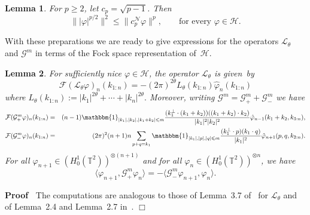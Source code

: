 \documentclass[10pt]{article}
\newcommand{\assign}{:=}
\newenvironment{proof}{\noindent\textbf{Proof\ }}{\hspace*{\fill}$\Box$\medskip}
\newtheorem{lemma}{Lemma}
\begin{document}
\begin{lemma}
  \label{lemma:hyper-n}For $p \geqslant 2$, let $c_p = \sqrt{p - 1}$. Then
  \[ \| | \varphi |^{p / 2} \|^2 \leqslant \| c_p^{\mathcal{N}} \varphi \|^p,
     \qquad \text{for every } \varphi \in \mathcal{H}. \]
\end{lemma}

With these preparations we are ready to give expressions for the operators
$\mathcal{L}_{\theta}$ and $\mathcal{G}^m$ in terms of the Fock space
representation of~$\mathcal{H}$.

\begin{lemma}
  For sufficiently nice $\varphi \in \mathcal{H}$, the operator
  $\mathcal{L}_{\theta}$ is given~by
  \begin{equation}
    \mathcal{F} (\mathcal{L}_{\theta} \varphi)_n (k_{1 : n}) = - (2 \pi)^{2
    \theta} L_{\theta} (k_{1 : n}) \hat{\varphi}_n (k_{1 : n})
    \label{eq:ltheta-fourier}
  \end{equation}
  where $L_{\theta} (k_{1 : n}) \assign | k_1 |^{2 \theta} + \cdots + | k_n
  |^{2 \theta} .$ Moreover, writing $\mathcal{G}^m =\mathcal{G}_+^m
  +\mathcal{G}_-^m$ we have
  \begin{eqnarray}
    \mathcal{F} (\mathcal{G}_+^m \varphi)_n (k_{1 : n}) & = & (n - 1)
    \mathbbm{1}_{| k_1 |, | k_2 |, | k_1 + k_2 | \leqslant m}
    \frac{(k_1^{\perp} \cdot (k_1 + k_2)) ((k_1 + k_2) \cdot k_2)}{| k_1 |^2 |
    k_2 |^2} \hat{\varphi}_{n - 1} (k_1 + k_2, k_{3 : n}), 
    \label{eq:gp-fourier}\\
    \mathcal{F} (\mathcal{G}_-^m \varphi)_n (k_{1 : n}) & = & (2 \pi)^2 (n +
    1) n \sum_{p + q = k_1} \mathbbm{1}_{| k_1 |, | p |, | q | \leqslant m}
    \frac{(k_1^{\perp} \cdot p) (k_1 \cdot q)}{| k_1 |^2} \hat{\varphi}_{n +
    1} (p, q, k_{2 : n}) .  \label{eq:gm-fourier}
  \end{eqnarray}
  For all $\varphi_{n + 1} \in (H^1_0 (\mathbb{T}^2))^{\otimes (n + 1)}$ and
  for all $\varphi_n \in (H^1_0 (\mathbb{T}^2))^{\otimes n}$, we have
  \begin{equation}
    \langle \varphi_{n + 1}, \mathcal{G}_+^m \varphi_n \rangle = - \langle
    \mathcal{G}_-^m \varphi_{n + 1}, \varphi_n \rangle . \label{eq:adj}
  \end{equation}
\end{lemma}

\begin{proof}
  The computations are analogous to those of Lemma~3.7
  of~{\cite{gubinelli2018energy}} for $\mathcal{L}_{\theta}$ and of Lemma~2.4
  and Lemma~2.7 in~{\cite{gubinelli2018infinitesimal}}.
\end{proof}
\end{document}
